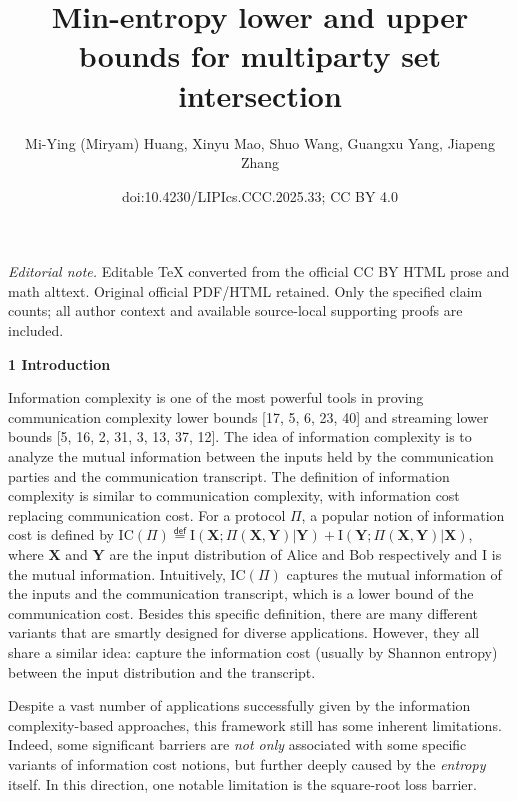 \documentclass[10pt,a4paper]{article}
\title{Min-entropy lower and upper bounds for multiparty set intersection}
\author{Mi-Ying (Miryam) Huang, Xinyu Mao, Shuo Wang, Guangxu Yang, Jiapeng Zhang}
\date{doi:10.4230/LIPIcs.CCC.2025.33; CC BY 4.0}
\begin{document}
\maketitle
\noindent\textit{Editorial note.} Editable TeX converted from the official CC BY HTML prose and math alttext. Original official PDF/HTML retained. Only the specified claim counts; all author context and available source-local supporting proofs are included.\par\medskip


\par\medskip\noindent\textbf{
1 Introduction}\par




Information complexity is one of the most powerful tools in proving communication complexity lower bounds [17, 5, 6, 23, 40] and streaming lower bounds [5, 16, 2, 31, 3, 13, 37, 12]. The idea of information complexity is to analyze the mutual information between the inputs held by the communication parties and the communication transcript. The definition of information complexity is similar to communication complexity, with information cost replacing communication cost. For a protocol $\Pi$, a popular notion of information cost is defined by
$\text{IC}(\Pi)\stackrel{{\scriptstyle\mathsf{def}}}{{=}}\text{I}(\bm{X};\Pi(\bm{X},\bm{Y})|\bm{Y})+\text{I}(\bm{Y};\Pi(\bm{X},\bm{Y})|\bm{X})$, where $\bm{X}$ and $\bm{Y}$ are the input distribution of Alice and Bob respectively and I is the mutual information. Intuitively, $\text{IC}(\Pi)$ captures the mutual information of the inputs and the communication transcript, which is a lower bound of the communication cost. Besides this specific definition, there are many different variants that are smartly designed for diverse applications. However, they all share a similar idea: capture the information cost (usually by Shannon entropy) between the input distribution and the transcript.\par




Despite a vast number of applications successfully given by the information complexity-based approaches, this framework still has some inherent limitations. Indeed, some significant barriers are \emph{not only} associated with some specific variants of information cost notions, but further deeply caused by the \emph{entropy} itself. In this direction, one notable limitation is the square-root loss barrier.\par
\end{document}
